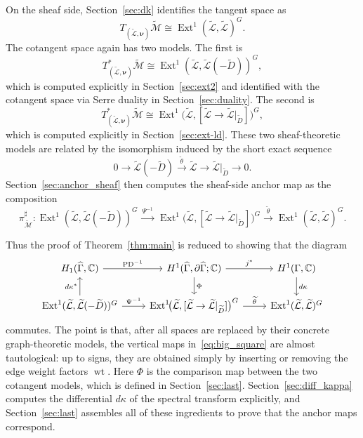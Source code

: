 \documentclass[dvipsnames,11pt]{article}
\theoremstyle{definition}
\newcommand{\wt}{\operatorname{wt}}
\newcommand{\C}{{\mathbb C}}
\def\Ext{\operatorname{Ext}}
\def\PD{\mathrm{PD}}
\def\Ext{\operatorname{Ext}}
\begin{document}
On the sheaf side, Section~\ref{sec:dk} identifies the tangent space as
\[
T_{(\widetilde{\mathcal L},\bm\nu)}\widetilde{\mathcal M}
\cong
\Ext^1(\widetilde{\mathcal L},\widetilde{\mathcal L})^G.
\]
The cotangent space again has two models. The first is
\[
T^*_{(\widetilde{\mathcal L},\bm\nu)}\widetilde{\mathcal M}
\cong
\Ext^1(\widetilde{\mathcal L},\widetilde{\mathcal L}(-\widetilde D))^G,
\]
which is computed explicitly in Section~\ref{sec:ext2} and identified with the cotangent space via Serre duality in Section~\ref{sec:duality}. The second is
\[
T^*_{(\widetilde{\mathcal L},\bm\nu)}\widetilde{\mathcal M}
\cong \Ext^1\!\bigl(\widetilde{\mathcal L},
[\widetilde{\mathcal L}\to \widetilde{\mathcal L}|_{\widetilde D}]\bigr)^G,
\]
which is computed explicitly in Section~\ref{sec:ext-ld}. These two sheaf-theoretic models are related by the isomorphism induced by the short exact sequence
\[
0 \rightarrow\widetilde{\mathcal L}(-\widetilde D) \xrightarrow[]{\widetilde \theta} \widetilde{\mathcal L}\to \widetilde{\mathcal L}|_{\widetilde D} \rightarrow 0.
\]
Section~\ref{sec:anchor_sheaf} then computes the sheaf-side anchor map as the composition
\[
\pi^\sharp_{\widetilde{\mathcal M}}:
\Ext^1(\widetilde{\mathcal L},\widetilde{\mathcal L}(-\widetilde D))^{G}
\xrightarrow{\ \Psi^{-1}\ }
\Ext^1\!\bigl(\widetilde{\mathcal L},
[\widetilde{\mathcal L}\to \widetilde{\mathcal L}|_{\widetilde D}]\bigr)^G
\xrightarrow{\ \widetilde\theta\ }
\Ext^1(\widetilde{\mathcal L},\widetilde{\mathcal L})^{G}.
\]

Thus the proof of Theorem~\ref{thm:main} is reduced to showing that the diagram
\begin{equation}\label{eq:big_square}
\begin{tikzcd}
 H_1(\widehat \Gamma,\C) \arrow[r,"{\PD^{-1}}"]  & H^1(\widehat \Gamma,\partial \widehat \Gamma;\C) \arrow[r,"j^*"] \arrow[d,"\Phi"]
&  H^1(\Gamma,\C) \arrow[d,"d \kappa"] \\
\Ext^1(\widetilde{\mathcal L},\widetilde{\mathcal L}(-{\widetilde D}))^G \arrow[u,"d\kappa^*"]
 \arrow[r,"\Psi^{-1}"]
&\Ext^1\!\bigl(\widetilde{\mathcal L},[\widetilde{\mathcal L}\to \widetilde{\mathcal L}|_{\widetilde D}]\bigr)^G
 \arrow[r,"\widetilde \theta"]
& \Ext^1(\widetilde{\mathcal L},\widetilde{\mathcal L})^G
\end{tikzcd}
\end{equation}
commutes. The point is that, after all spaces are replaced by their concrete graph-theoretic models, the vertical maps in~\eqref{eq:big_square} are almost tautological: up to signs, they are obtained simply by inserting or removing the edge weight factors \(\wt\). Here \(\Phi\) is the comparison map between the two cotangent models, which is defined in Section~\ref{sec:last}. Section~\ref{sec:diff_kappa} computes the differential \(d\kappa\) of the spectral transform explicitly, and Section~\ref{sec:last} assembles all of these ingredients to prove that the anchor maps correspond.
\end{document}
